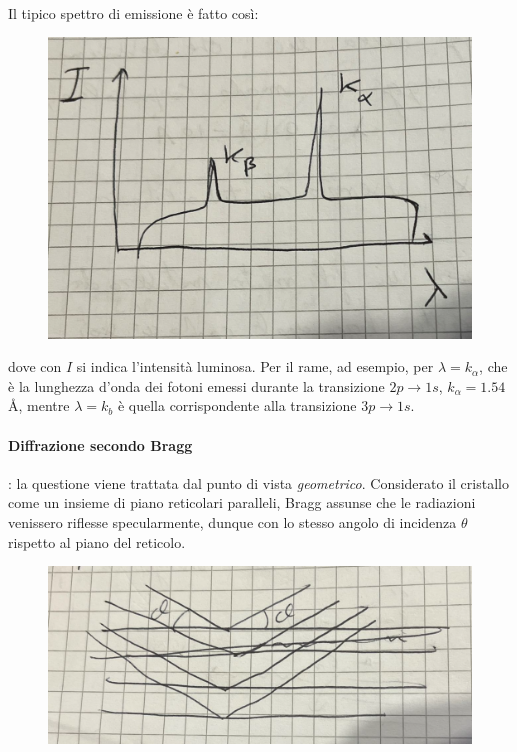 \documentclass{book}
\begin{document}
            \paragraph{}
                Il tipico spettro di emissione è fatto così:
                \begin{figure}[h!]
                    \centering
                    \includegraphics[width=0.5\linewidth]{img/spettroEmissioneLez8.png}
                \end{figure}
                dove con $I$ si indica l'intensità luminosa.\newline
                Per il rame, ad esempio, per $\lambda = k_{\alpha}$, che è la lunghezza d'onda dei fotoni emessi durante la transizione $2p \to 1s$, $k_{\alpha}=1.54 $\r{A}, mentre $\lambda = k_{b}$ è quella corrispondente alla transizione $3p \to 1s$.

            \paragraph{Diffrazione secondo Bragg}: la questione viene trattata dal punto di vista \textit{geometrico}. Considerato il cristallo come un insieme di piano reticolari paralleli, Bragg assunse che le radiazioni venissero riflesse specularmente, dunque con lo stesso angolo di incidenza $\theta$ rispetto al piano del reticolo.
            \begin{figure}[h!]
                \centering
                \includegraphics[width=0.75\linewidth]{img/reticoloBragg1Lez8.png}
            \end{figure}
\end{document}
